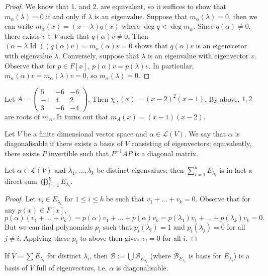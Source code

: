 \documentclass{scrartcl}
\def\le{\leqslant}
\def\L{\mathcal{L}}
\def\B{\mathcal{B}}
\DeclareMathOperator{\id}{Id}
\begin{document}
\begin{proof}
	We know that 1. and 2. are equivalent, so it suffices to show that $m_\alpha(\lambda) = 0$ if and only if $\lambda$ is an eigenvalue. Suppose that $m_\alpha(\lambda) = 0$, then we can write $m_\alpha(x) = (x-\lambda)q(x)$ where $\deg{q}<\deg{m_\alpha}$. Since $q(\alpha) \ne 0$, there exists $v \in V$ such that $q(\alpha)v \ne 0$. Then $(\alpha-\lambda \id)(q(\alpha)v) = m_\alpha(\alpha)v = 0$ shows that $q(\alpha)v$ is an eigenvcetor with eigenvalue $\lambda$. Conversely, suppose that $\lambda$ is an eigenvalue with eigenvector $v$. Observe that for $p \in F[x]$, $p(\alpha)v = p(\lambda)v$. In particular, $m_\alpha(\alpha)v = m_\alpha(\lambda)v = 0$, so $m_\alpha(\lambda)=0$.
\end{proof}
\begin{example}
	Let $A = \begin{pmatrix}
		5 & -6 & -6 \\
		-1 & 4 & 2 \\
		3 & -6 & -4
	\end{pmatrix}$. Then $\chi_A(x) = (x-2)^2(x-1)$. By above, $1, 2$ are roots of $m_A$. It turns out that $m_A(x) = (x-1)(x-2)$.
\end{example}
\begin{definition}
	Let $V$ be a finite dimensional vector space and $\alpha \in \L(V)$. We say that $\alpha$ is diagonalisable if there exists a basis of $V$ consisting of eigenvectors; equivalently, there exists $P$ invertible such that $P^{-1}AP$ is a diagonal matrix. 
\end{definition}
\begin{proposition}
	Let $\alpha \in \L(V)$ and $\lambda_1, \dots, \lambda_k$ be distinct eigenvalues; then $\sum_{i=1}^k E_{\lambda_i}$ is in fact a direct sum $\bigoplus_{i=1}^k E_{\lambda_i}$.
\end{proposition}
\begin{proof}
	Let $v_i \in E_{\lambda_i}$ for $1\le i \le k$ be such that $v_1+\dots+v_k=0$. Observe that for any $p(x) \in F[x]$, 
	\[p(\alpha)(v_1+\dots+v_k) = p(\alpha)v_1+\dots+p(\alpha)v_k = p(\lambda_1)v_1+\dots+p(\lambda_k)v_k = 0.\]
	But we can find polynomials $p_i$ such that $p_i(\lambda_i) = 1$ and $p_i(\lambda_j) = 0$ for all $j \ne i$. Applying these $p_i$ to above then gives $v_i = 0$ for all $i$.
\end{proof}
\begin{corollary}
	If $V = \sum E_{\lambda_i}$ for distinct $\lambda_i$, then $\B := \bigcup \B_{E_{\lambda_i}}$ (where $\B_{E_{\lambda_i}}$ is basis for $E_{\lambda_i}$) is a basis of $V$ full of eigenvectors, i.e. $\alpha$ is diagonalisable.
\end{corollary}
\end{document}
